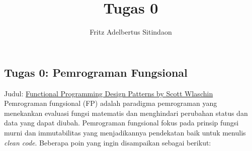 \documentclass{article}
\title{Tugas 0}
\author{Fritz Adelbertus Sitindaon}
\date{}
\begin{document}
\begin{flushright}
    \section*{Tugas 0: Pemrograman Fungsional}
\end{flushright}

Judul: \href{{https://www.youtube.com/watch?v=E8I19uA-wGY&list=RDQMz2xSS6pH_wo&start_radio=1}}
{Functional Programming Design Patterns by Scott Wlaschin}\\

Pemrograman fungsional (FP) adalah paradigma pemrograman yang menekankan 
evaluasi fungsi matematis dan menghindari perubahan status dan data yang 
dapat diubah. Pemrograman fungsional fokus pada prinsip fungsi murni dan 
immutabilitas yang menjadikannya pendekatan baik untuk menulis 
\textit{clean  code}. Beberapa poin yang ingin disampaikan sebagai berikut:
\end{document}
